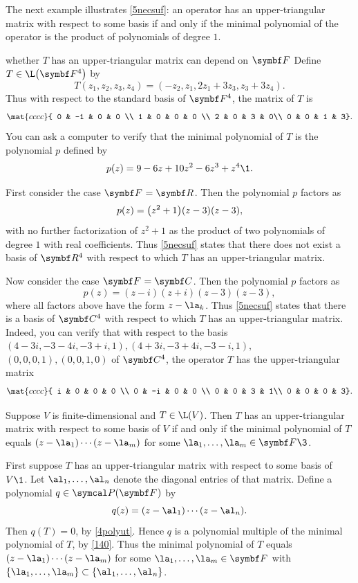 The next example illustrates \ref{5necsuf}: an operator has an upper-triangular matrix with respect to some basis if and only if the minimal polynomial of the operator is the product of polynomials of degree $1$.

\begin{example}{whether\/ $T$ has an upper-triangular matrix can depend on\/ $\F{}$}
Define $T \in \L\paren[\big]{\F4}$ by
\[
T(z_1, z_2, z_3, z_4) = (-z_2, z_1, 2 z_1 + 3z_3, z_3+3z_4).
\]
Thus with respect to the standard basis of $\F4$, the matrix of $T$ is
\[
\mat{cccc}{
0 & -1 & 0 & 0 \\
1 & 0 & 0 & 0 \\
2 & 0 & 3 & 0\\
0 & 0 & 1 & 3}.
\]
You can ask a computer to verify that the minimal polynomial of $T$ is the polynomial $p$ defined by
\[
p(z) = 9 - 6z + 10 z^2 -6z^3 + z^4\1.
\]

First consider the case $\F{} = \R{}$. Then the polynomial $p$ factors as
\[
p(z) = \paren[\big]{z^2 + 1} (z-3)(z-3),
\]
with no further factorization of $z^2 + 1$ as the product of two polynomials of degree $1$ with real coefficients. Thus \ref{5necsuf} states that there does not exist a basis of $\R4$ with respect to which $T$ has an upper-triangular matrix.

Now consider the case $\F{} = \C{}$. Then the polynomial $p$ factors as
\[
p(z) = (z-i)(z+i)(z-3)(z-3),
\]
where all factors above have the form $z - \la_k$. Thus \ref{5necsuf} states that there is a basis of $\C4$ with respect to which $T$ has an upper-triangular matrix. Indeed, you can verify that with respect to the basis $(4-3i, -3-4i,-3+i,1), (4+3i,-3+4i,-3-i,1),$ $(0, 0, 0, 1), (0,0,1, 0)$ of $\C4$, the operator $T$ has the upper-triangular matrix
\[
\mat{cccc}{
i & 0 & 0 & 0 \\
0 & -i & 0 & 0 \\
0 & 0 & 3 & 1\\
0 & 0 & 0 & 3}.
\]
\end{example}

{Suppose $V$ is finite-dimensional and $T \in \L(V)$. Then $T$ has an upper-triangular matrix with respect to some basis of $V$ if and only if the minimal polynomial of $T$ equals $(z-\la_1) \cdots (z-\la_m)$ for some $\la_1, \ldots, \la_m \in \F{}\3$.}

\proof
First suppose $T$ has an upper-triangular matrix with respect to some basis of $V\1$. Let $\al_1, \ldots, \al_n$ denote the diagonal entries of that matrix. Define a polynomial $q \in \P(\F{})$ by
\[
q(z) = (z-\al_1) \cdots (z-\al_n).
\]
Then $q(T) = 0$, by \ref{4polyut}. Hence $q$ is a polynomial multiple of the minimal polynomial of $T$, by \ref{140}. Thus the minimal polynomial of $T$ equals $(z-\la_1) \cdots (z-\la_m)$ for some $\la_1, \ldots, \la_m \in \F{}$ with
$\br{\la_1, \ldots, \la_m} \subset \br{\al_1, \ldots, \al_n}$.

